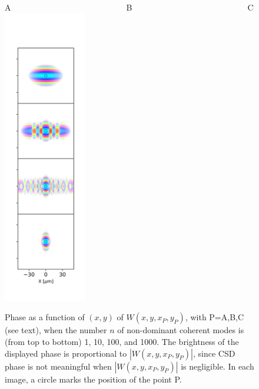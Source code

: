 \documentclass{iucr}              %
\begin{document}
\begin{figure}\label{pointP}%
\caption{Phase as a function of $(x,y)$ of $W(x,y,x_P,y_P)$, with P=A,B,C (see text), when the number $n$ of non-dominant coherent modes is (from top to bottom) 1, 10, 100, and 1000. The brightness of the displayed phase is proportional to $|W(x,y,x_P,y_P)|$, since CSD phase is not meaningful when $|W(x,y,x_P,y_P)|$ is negligible. In each image, a circle marks the position of the point P.}
A~~~~~~~~~~~~~~~~~~~~~~~~~~~~B~~~~~~~~~~~~~~~~~~~~~~~~~~~~C\\
\includegraphics[width=0.32\textwidth]{Figures/vx_id16a_A.png}

\end{figure}
\end{document}

